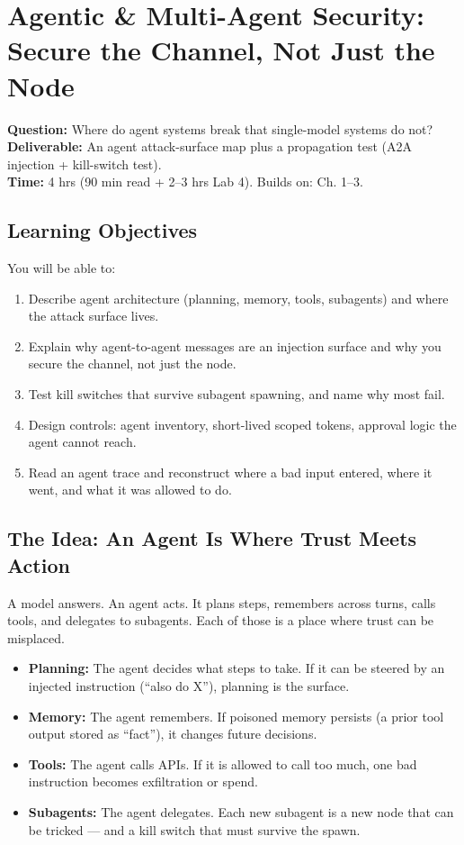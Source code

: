 \chapter{Agentic \& Multi-Agent Security: Secure the Channel, Not Just the Node}
\label{ch:4}

\begin{tcolorbox}[colback=white,colframe=checkblack,title=Chapter 4 at a Glance,fonttitle=\bfseries,sharp corners,boxrule=1pt]
\textbf{Question:} Where do agent systems break that single-model systems do not?\\
\textbf{Deliverable:} An agent attack-surface map plus a propagation test (A2A injection + kill-switch test).\\
\textbf{Time:} 4 hrs (90 min read + 2–3 hrs Lab 4). Builds on: Ch. 1–3.
\end{tcolorbox}

\section{Learning Objectives}
\fbadge
You will be able to:
\begin{enumerate}
\item Describe agent architecture (planning, memory, tools, subagents) and where the attack surface lives.
\item Explain why agent-to-agent messages are an injection surface and why you secure the channel, not just the node.
\item Test kill switches that survive subagent spawning, and name why most fail.
\item Design controls: agent inventory, short-lived scoped tokens, approval logic the agent cannot reach.
\item Read an agent trace and reconstruct where a bad input entered, where it went, and what it was allowed to do.
\end{enumerate}

\section{The Idea: An Agent Is Where Trust Meets Action}
\tierF

A model answers. An agent acts. It plans steps, remembers across turns, calls tools, and delegates to subagents. Each of those is a place where trust can be misplaced.

\begin{itemize}
\item \textbf{Planning:} The agent decides what steps to take. If it can be steered by an injected instruction (``also do X''), planning is the surface.
\item \textbf{Memory:} The agent remembers. If poisoned memory persists (a prior tool output stored as ``fact''), it changes future decisions.
\item \textbf{Tools:} The agent calls APIs. If it is allowed to call too much, one bad instruction becomes exfiltration or spend.
\item \textbf{Subagents:} The agent delegates. Each new subagent is a new node that can be tricked — and a kill switch that must survive the spawn.
\end{itemize}

